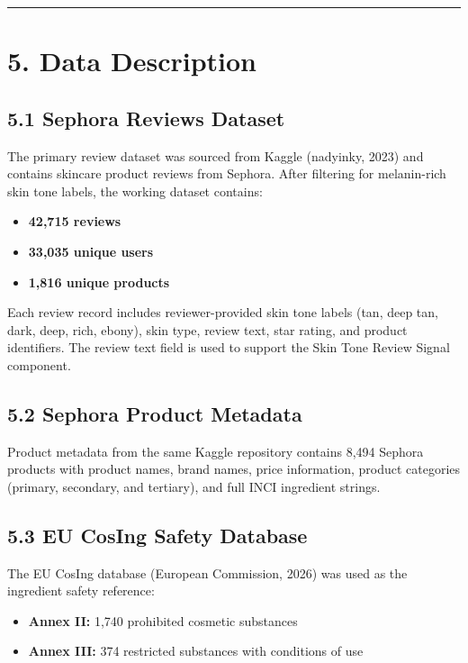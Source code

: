 \documentclass[
  letterpaper,
  DIV=11,
  numbers=noendperiod]{scrartcl}
\providecommand{\tightlist}{%
  \setlength{\itemsep}{0pt}\setlength{\parskip}{0pt}}
\begin{document}
\begin{center}\rule{0.5\linewidth}{0.5pt}\end{center}

\section{5. Data Description}\label{data-description}

\subsection{5.1 Sephora Reviews Dataset}\label{sephora-reviews-dataset}

The primary review dataset was sourced from Kaggle (nadyinky, 2023) and
contains skincare product reviews from Sephora. After filtering for
melanin-rich skin tone labels, the working dataset contains:

\begin{itemize}
\tightlist
\item
  \textbf{42,715 reviews}
\item
  \textbf{33,035 unique users}
\item
  \textbf{1,816 unique products}
\end{itemize}

Each review record includes reviewer-provided skin tone labels (tan,
deep tan, dark, deep, rich, ebony), skin type, review text, star rating,
and product identifiers. The review text field is used to support the
Skin Tone Review Signal component.

\subsection{5.2 Sephora Product
Metadata}\label{sephora-product-metadata}

Product metadata from the same Kaggle repository contains 8,494 Sephora
products with product names, brand names, price information, product
categories (primary, secondary, and tertiary), and full INCI ingredient
strings.

\subsection{5.3 EU CosIng Safety
Database}\label{eu-cosing-safety-database}

The EU CosIng database (European Commission, 2026) was used as the
ingredient safety reference:

\begin{itemize}
\tightlist
\item
  \textbf{Annex II:} 1,740 prohibited cosmetic substances
\item
  \textbf{Annex III:} 374 restricted substances with conditions of use
\end{itemize}
\end{document}
